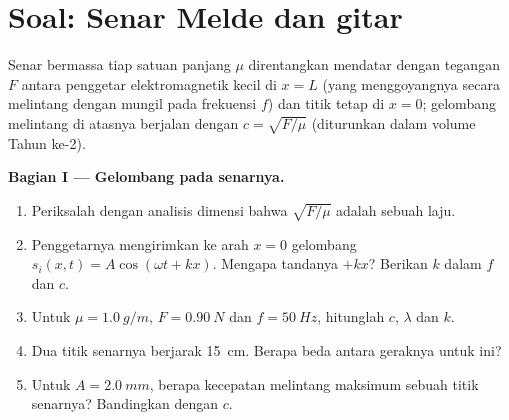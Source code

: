 \section{Soal: Senar Melde dan gitar}

\begin{problem}
\label{pb:b1:wave-propagation:1}
Senar bermassa tiap satuan panjang $\mu$ direntangkan mendatar dengan
tegangan $F$ antara penggetar elektromagnetik kecil di $x = L$ (yang
menggoyangnya secara melintang dengan  mungil pada frekuensi
$f$) dan titik tetap di $x = 0$; gelombang melintang di atasnya berjalan
dengan $c = \sqrt{F/\mu}$ (diturunkan dalam volume Tahun ke-2).

\medskip
\noindent\textbf{Bagian I --- Gelombang pada senarnya.}
\begin{enumerate}
  \item Periksalah dengan analisis dimensi bahwa $\sqrt{F/\mu}$ adalah
        sebuah laju.
  \item Penggetarnya mengirimkan ke arah $x = 0$ gelombang
        $s_i(x, t) = A\cos(\omega t + kx)$. Mengapa tandanya $+kx$?
        Berikan $k$ dalam $f$ dan $c$.
  \item Untuk $\mu = \qty{1.0}{g/m}$, $F = \qty{0.90}{N}$ dan
        $f = \qty{50}{Hz}$, hitunglah $c$, $\lambda$ dan $k$.
  \item Dua titik senarnya berjarak \qty{15}{cm}. Berapa beda 
        antara geraknya untuk  ini?
  \item Untuk $A = \qty{2.0}{mm}$, berapa kecepatan melintang maksimum
        sebuah titik senarnya? Bandingkan dengan $c$.
\end{enumerate}


\end{problem}
